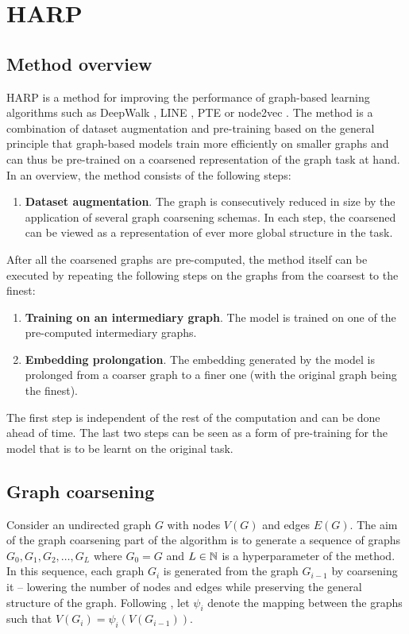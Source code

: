 \section{HARP}\label{sec:harp}

\subsection{Method overview}

HARP is a method for improving the performance of graph-based learning algorithms such as DeepWalk \cite{perozzi_deepwalk_2014}, LINE \cite{tang_line_2015}, PTE \cite{tang_pte_2015} or node2vec \cite{grover_node2vec_2016}. The method is a combination of dataset augmentation and pre-training based on the general principle that graph-based models train more efficiently on smaller graphs and can thus be pre-trained on a coarsened representation of the graph task at hand. In an overview, the method consists of the following steps:
\begin{enumerate}
  \item \textbf{Dataset augmentation}. The graph is consecutively reduced in size by the application of several graph coarsening schemas. In each step, the coarsened can be viewed as a representation of ever more global structure in the task.
\end{enumerate}
After all the coarsened graphs are pre-computed, the method itself can be executed by repeating the following steps on the graphs from the coarsest to the finest:
\begin{enumerate}[start=2]
  \item \textbf{Training on an intermediary graph}. The model is trained on one of the pre-computed intermediary graphs.
  \item \textbf{Embedding prolongation}. The embedding generated by the model is prolonged from a coarser graph to a finer one (with the original graph being the finest).
\end{enumerate}

The first step is independent of the rest of the computation and can be done ahead of time. The last two steps can be seen as a form of pre-training for the model that is to be learnt on the original task.

\subsection{Graph coarsening}\label{sec:graph-coarsening}
\sloppy Consider an undirected graph \( G \) with nodes \( V \left( G \right) \) and edges \( E \left( G \right) \). The aim of the graph coarsening part of the algorithm is to generate a sequence of graphs \( G_0, G_1, G_2, \dots, G_L \) where \( G_0 = G \) and \( L \in \mathbb{N} \) is a hyperparameter of the method. In this sequence, each graph \( G_i \) is generated from the graph \( G_{i - 1} \) by coarsening it -- lowering the number of nodes and edges while preserving the general structure of the graph. Following \cite{chen_harp_2018}, let \( \psi_i \) denote the mapping between the graphs such that \( V \left( G_i \right) = \psi_i \left( V \left( G_{i - 1} \right) \right) \).

